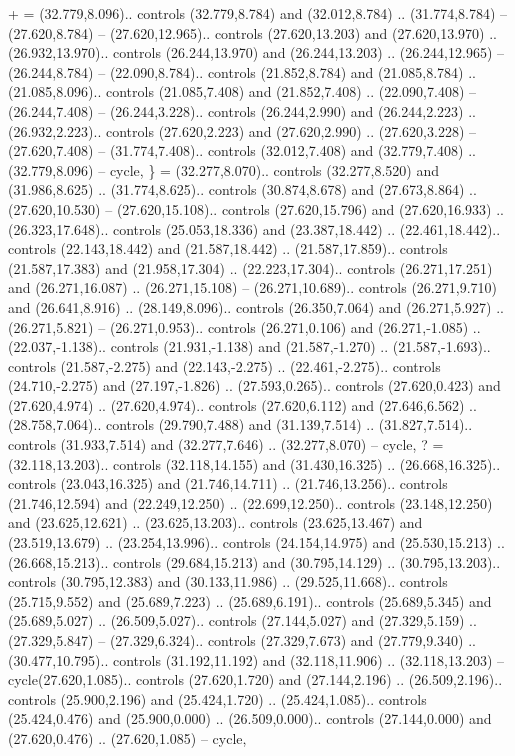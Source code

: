 {+} = {(32.779,8.096).. controls (32.779,8.784) and (32.012,8.784) .. (31.774,8.784) -- (27.620,8.784) -- (27.620,12.965).. controls (27.620,13.203) and (27.620,13.970) .. (26.932,13.970).. controls (26.244,13.970) and (26.244,13.203) .. (26.244,12.965) -- (26.244,8.784) -- (22.090,8.784).. controls (21.852,8.784) and (21.085,8.784) .. (21.085,8.096).. controls (21.085,7.408) and (21.852,7.408) .. (22.090,7.408) -- (26.244,7.408) -- (26.244,3.228).. controls (26.244,2.990) and (26.244,2.223) .. (26.932,2.223).. controls (27.620,2.223) and (27.620,2.990) .. (27.620,3.228) -- (27.620,7.408) -- (31.774,7.408).. controls (32.012,7.408) and (32.779,7.408) .. (32.779,8.096) -- cycle},
{\}} = {(32.277,8.070).. controls (32.277,8.520) and (31.986,8.625) .. (31.774,8.625).. controls (30.874,8.678) and (27.673,8.864) .. (27.620,10.530) -- (27.620,15.108).. controls (27.620,15.796) and (27.620,16.933) .. (26.323,17.648).. controls (25.053,18.336) and (23.387,18.442) .. (22.461,18.442).. controls (22.143,18.442) and (21.587,18.442) .. (21.587,17.859).. controls (21.587,17.383) and (21.958,17.304) .. (22.223,17.304).. controls (26.271,17.251) and (26.271,16.087) .. (26.271,15.108) -- (26.271,10.689).. controls (26.271,9.710) and (26.641,8.916) .. (28.149,8.096).. controls (26.350,7.064) and (26.271,5.927) .. (26.271,5.821) -- (26.271,0.953).. controls (26.271,0.106) and (26.271,-1.085) .. (22.037,-1.138).. controls (21.931,-1.138) and (21.587,-1.270) .. (21.587,-1.693).. controls (21.587,-2.275) and (22.143,-2.275) .. (22.461,-2.275).. controls (24.710,-2.275) and (27.197,-1.826) .. (27.593,0.265).. controls (27.620,0.423) and (27.620,4.974) .. (27.620,4.974).. controls (27.620,6.112) and (27.646,6.562) .. (28.758,7.064).. controls (29.790,7.488) and (31.139,7.514) .. (31.827,7.514).. controls (31.933,7.514) and (32.277,7.646) .. (32.277,8.070) -- cycle},
{?} = {(32.118,13.203).. controls (32.118,14.155) and (31.430,16.325) .. (26.668,16.325).. controls (23.043,16.325) and (21.746,14.711) .. (21.746,13.256).. controls (21.746,12.594) and (22.249,12.250) .. (22.699,12.250).. controls (23.148,12.250) and (23.625,12.621) .. (23.625,13.203).. controls (23.625,13.467) and (23.519,13.679) .. (23.254,13.996).. controls (24.154,14.975) and (25.530,15.213) .. (26.668,15.213).. controls (29.684,15.213) and (30.795,14.129) .. (30.795,13.203).. controls (30.795,12.383) and (30.133,11.986) .. (29.525,11.668).. controls (25.715,9.552) and (25.689,7.223) .. (25.689,6.191).. controls (25.689,5.345) and (25.689,5.027) .. (26.509,5.027).. controls (27.144,5.027) and (27.329,5.159) .. (27.329,5.847) -- (27.329,6.324).. controls (27.329,7.673) and (27.779,9.340) .. (30.477,10.795).. controls (31.192,11.192) and (32.118,11.906) .. (32.118,13.203) -- cycle(27.620,1.085).. controls (27.620,1.720) and (27.144,2.196) .. (26.509,2.196).. controls (25.900,2.196) and (25.424,1.720) .. (25.424,1.085).. controls (25.424,0.476) and (25.900,0.000) .. (26.509,0.000).. controls (27.144,0.000) and (27.620,0.476) .. (27.620,1.085) -- cycle},
